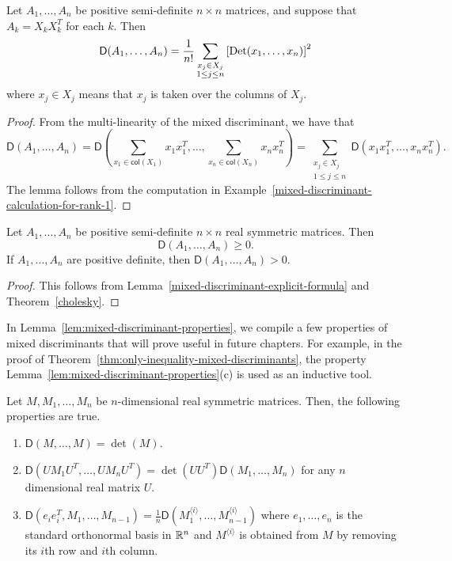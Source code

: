 \documentclass{puthesis-UG}
\begin{document}
\begin{lem}  \label{mixed-discriminant-explicit-formula}
	Let $A_1, \ldots, A_n$ be positive semi-definite $n \times n$ matrices, and suppose that $A_k = X_k X_k^T$ for each $k$. Then
	\[
		\mathsf{D} (A_1, \ldots, A_n) = \frac{1}{n!} \sum_{\substack{x_j \in X_j \\ 1 \leq j \leq n}} \left [ \operatorname{Det}(x_1, \ldots, x_n) \right ]^2
	\]
	where $x_j \in X_j$ means that $x_j$ is taken over the columns of $X_j$.
\end{lem}

\begin{proof}
	From the multi-linearity of the mixed discriminant, we have that 
	\[
		\mathsf{D}(A_1, \ldots, A_n) = \mathsf{D} \left ( \sum_{x_1 \in \mathsf{col}(X_1)} x_1x_1^T, \ldots, \sum_{x_n \in \mathsf{col}(X_n)} x_nx_n^T \right ) = \sum_{\substack{x_j \in X_j \\ 1 \leq j \leq n}} \mathsf{D} (x_1x_1^T, \ldots, x_nx_n^T).
	\]
	The lemma follows from the computation in Example~\ref{mixed-discriminant-calculation-for-rank-1}. 
\end{proof}

\begin{cor} \label{final-positivity-corollary}
	Let $A_1, \ldots, A_n$ be positive semi-definite $n \times n$ real symmetric matrices. Then 
	\[
		\mathsf{D}(A_1, \ldots, A_n) \geq 0.
	\]	
	If $A_1, \ldots, A_n$ are positive definite, then $\mathsf{D}(A_1, \ldots, A_n) > 0$. 
\end{cor}

\begin{proof}
	This follows from Lemma~\ref{mixed-discriminant-explicit-formula} and Theorem~\ref{cholesky}. 
\end{proof}

In Lemma~\ref{lem:mixed-discriminant-properties}, we compile a few properties of mixed discriminants that will prove useful in future chapters. For example, in the proof of Theorem~\ref{thm:only-inequality-mixed-discriminants}, the property Lemma~\ref{lem:mixed-discriminant-properties}(c) is used as an inductive tool. 

\begin{lem} \label{lem:mixed-discriminant-properties}
	Let $M, M_1, \ldots, M_n$ be $n$-dimensional real symmetric matrices. Then, the following properties are true. 
	\begin{enumerate}[label = (\alph*)]
		\item $\mathsf{D}(M, \ldots, M) = \det (M)$. 
		\item $\mathsf{D}(U M_1 U^T, \ldots, U M_n U^T) = \det (UU^T) \mathsf{D}(M_1, \ldots, M_n)$ for any $n$ dimensional real matrix $U$.
		\item $\mathsf{D}(e_ie_i^T, M_1, \ldots, M_{n-1}) = \frac{1}{n} \mathsf{D}(M_1^{\langle i \rangle}, \ldots, M_{n-1}^{\langle i \rangle})$ where $e_1, \ldots, e_n$ is the standard orthonormal basis in $\mathbb{R}^n$ and $M^{\langle i \rangle}$ is obtained from $M$ by removing its $i$th row and $i$th column. 
	\end{enumerate}
\end{lem}
\end{document}
